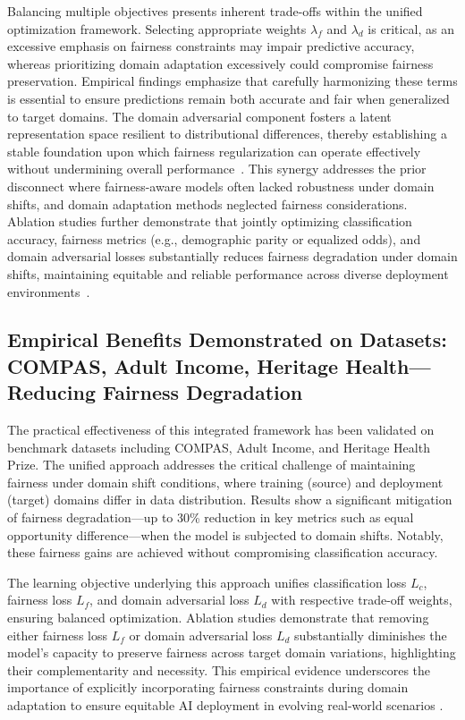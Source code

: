 \documentclass[sigconf]{acmart}
\begin{document}
Balancing multiple objectives presents inherent trade-offs within the unified optimization framework. Selecting appropriate weights \(\lambda_f\) and \(\lambda_d\) is critical, as an excessive emphasis on fairness constraints may impair predictive accuracy, whereas prioritizing domain adaptation excessively could compromise fairness preservation. Empirical findings emphasize that carefully harmonizing these terms is essential to ensure predictions remain both accurate and fair when generalized to target domains. The domain adversarial component fosters a latent representation space resilient to distributional differences, thereby establishing a stable foundation upon which fairness regularization can operate effectively without undermining overall performance~\cite{ref26}. This synergy addresses the prior disconnect where fairness-aware models often lacked robustness under domain shifts, and domain adaptation methods neglected fairness considerations. Ablation studies further demonstrate that jointly optimizing classification accuracy, fairness metrics (e.g., demographic parity or equalized odds), and domain adversarial losses substantially reduces fairness degradation under domain shifts, maintaining equitable and reliable performance across diverse deployment environments~\cite{ref26}.

\subsection{Empirical Benefits Demonstrated on Datasets: COMPAS, Adult Income, Heritage Health—Reducing Fairness Degradation}

The practical effectiveness of this integrated framework has been validated on benchmark datasets including COMPAS, Adult Income, and Heritage Health Prize. The unified approach addresses the critical challenge of maintaining fairness under domain shift conditions, where training (source) and deployment (target) domains differ in data distribution. Results show a significant mitigation of fairness degradation—up to 30\% reduction in key metrics such as equal opportunity difference—when the model is subjected to domain shifts. Notably, these fairness gains are achieved without compromising classification accuracy.

The learning objective underlying this approach unifies classification loss \(L_c\), fairness loss \(L_f\), and domain adversarial loss \(L_d\) with respective trade-off weights, ensuring balanced optimization. Ablation studies demonstrate that removing either fairness loss \(L_f\) or domain adversarial loss \(L_d\) substantially diminishes the model’s capacity to preserve fairness across target domain variations, highlighting their complementarity and necessity. This empirical evidence underscores the importance of explicitly incorporating fairness constraints during domain adaptation to ensure equitable AI deployment in evolving real-world scenarios \cite{ref26}.
\end{document}
